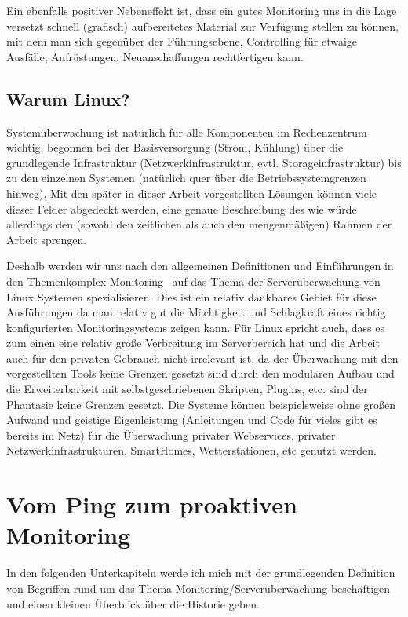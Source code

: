 \documentclass[12pt,a4paper,parskip]{scrreprt}
\begin{document}
	  Ein ebenfalls positiver Nebeneffekt ist, dass ein gutes Monitoring uns in die Lage versetzt schnell (grafisch) aufbereitetes Material zur Verfügung stellen zu können, mit dem man sich gegenüber der Führungsebene, Controlling für etwaige Ausfälle, Aufrüstungen, Neuanschaffungen rechtfertigen kann.
	  
	\section{Warum Linux?}
	Systemüberwachung ist natürlich für alle Komponenten im Rechenzentrum wichtig, begonnen bei der Basisversorgung (Strom, Kühlung) über die grundlegende Infrastruktur (Netzwerkinfrastruktur, evtl. Storageinfrastruktur) bis zu den einzelnen Systemen (natürlich quer über die Betriebssystemgrenzen hinweg). Mit den später in dieser Arbeit vorgestellten Lösungen können viele dieser Felder abgedeckt werden, eine genaue Beschreibung des wie würde allerdings den (sowohl den zeitlichen als auch den mengenmäßigen) Rahmen der Arbeit sprengen.
	
	Deshalb werden wir uns nach den allgemeinen Definitionen und Einführungen in den Themenkomplex \glqq Monitoring \grqq\ auf das Thema der Serverüberwachung von Linux Systemen spezialisieren. Dies ist ein relativ dankbares Gebiet für diese Ausführungen da man relativ gut die Mächtigkeit und Schlagkraft eines richtig konfigurierten Monitoringsystems zeigen kann. Für Linux spricht auch, dass es zum einen eine relativ große Verbreitung im Serverbereich hat und die Arbeit auch für den privaten Gebrauch nicht irrelevant ist, da der Überwachung mit den vorgestellten Tools keine Grenzen gesetzt sind durch den modularen Aufbau und die Erweiterbarkeit mit selbstgeschriebenen Skripten, Plugins, \acrshort{etc}. sind der Phantasie keine Grenzen gesetzt. Die Systeme können beispielsweise ohne großen Aufwand und geistige Eigenleistung (Anleitungen und Code für vieles gibt es bereits im Netz) für die Überwachung privater Webservices, privater Netzwerkinfrastrukturen, SmartHomes, Wetterstationen, \acrshort{etc} genutzt werden.
		
	
	\chapter{Vom Ping zum proaktiven Monitoring}
	In den folgenden Unterkapiteln werde ich mich mit der grundlegenden Definition von Begriffen rund um das Thema Monitoring/Serverüberwachung beschäftigen und einen kleinen Überblick über die Historie geben.
\end{document}
